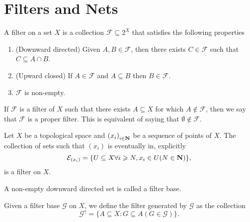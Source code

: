 \section{Filters and Nets}

\begin{definition}\label{def: filter}
  A filter on a set \(X\) is a collection \(\mathcal F \subseteq 2^X\) that
  satisfies the following properties
  \begin{enumerate}[(F1)]
    \item\label{def: filter F1}
      (Downward directed) Given \(A, B \in \mathcal F\), then there exists
      \(C \in \mathcal F\) such that \(C \subseteq A \cap B\).
    \item\label{def: filter F2}
      (Upward closed) If \(A \in \mathcal F\) and \(A \subseteq B\) then \(B
      \in \mathcal F\).
    \item\label{def: filter F3}
      \(\mathcal F\) is non-empty.
  \end{enumerate}
\end{definition}

\begin{definition}
  If \(\mathcal F\) is a filter of \(X\) such that there exists \(A \subseteq
  X\) for which \(A \not\in \mathcal F\), then we say that \(\mathcal F\) is a
  proper filter. This is equivalent of saying that \(\emptyset \not\in \mathcal
  F\).
\end{definition}

\begin{proposition}
  Let \(X\) be a topological space and \({(x_i)}_{i \in \mathbf{N}}\) be a
  sequence of points of \(X\). The collection of sets such that \((x_i)\) is
  eventually in, explicitly
  \[
    \mathcal E_{(x_i)} = \{U \subseteq X \relax \forall i \geqslant N, x_i \in U (N \in
    \mathbf{N})\},
  \]
  is a filter on \(X\).
\end{proposition}

\begin{definition}
  A non-empty downward directed set is called a filter base.
\end{definition}

\begin{proposition}
  Given a filter base \(\mathcal G\) on \(X\), we define the filter generated by
  \(\mathcal G\) as the collection
  \[
    \mathcal G^\uparrow = \{A \subseteq X \colon G \subseteq A (G \in \mathcal G)\}.
  \]
\end{proposition}

